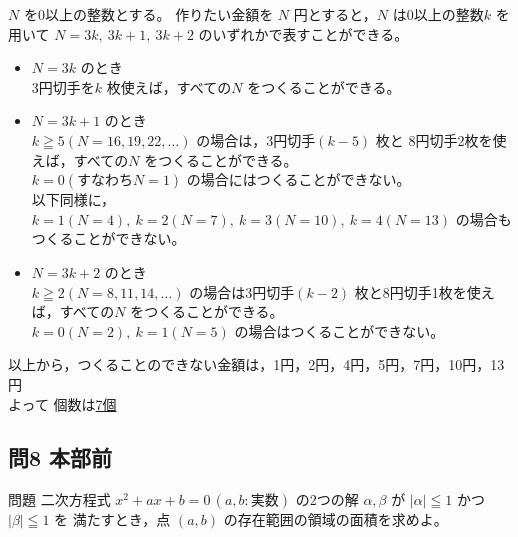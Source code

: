 \documentclass[a5paper]{ltjsarticle}
\begin{document}
\( N\) を0以上の整数とする。
作りたい金額を \( N\) 円とすると，\( N\) は0以上の整数\( k\) を用いて
\( N=3k,\: 3k+1,\: 3k+2\) のいずれかで表すことができる。
\begin{itemize}
  \item \( N=3k\) のとき\\
    3円切手を\( k\) 枚使えば，すべての\( N\) をつくることができる。
  \item \( N=3k+1\) のとき\\
    \( k\geqq 5(N=16,19,22,\ldots)\) の場合は，3円切手\( (k-5)\) 枚と
    8円切手2枚を使えば，すべての\( N\) をつくることができる。\\
    \(k=0(\text{すなわち}N=1)\) の場合にはつくることができない。\\
    以下同様に，\( k=1(N=4),\: k=2(N=7),\: k=3(N=10),\: k=4(N=13)\) の場合もつくることができない。
  \item \( N=3k+2\) のとき\\
    \(k\geqq 2(N=8,11,14,\ldots)\) の場合は3円切手\( (k-2)\) 枚と8円切手1枚を使えば，すべての\( N\) をつくることができる。\\
    \(k=0(N=2),\: k=1(N=5)\) の場合はつくることができない。
\end{itemize}
以上から，つくることのできない金額は，1円，2円，4円，5円，7円，10円，13円\\
よって 個数は\quad \underline{7個}


\subsection*{問8 本部前}
\begin{itembox}[l]{問題}
  二次方程式 $ x^2+ax+b=0\, (a,b:\mbox{実数})$ の2つの解 $ \alpha , \beta $ が $ |\alpha |\leqq 1 $ かつ $|\beta |\leqq 1$ を
  満たすとき，点 $ (a,b)$ の存在範囲の領域の面積を求めよ。
\end{itembox}
\end{document}
